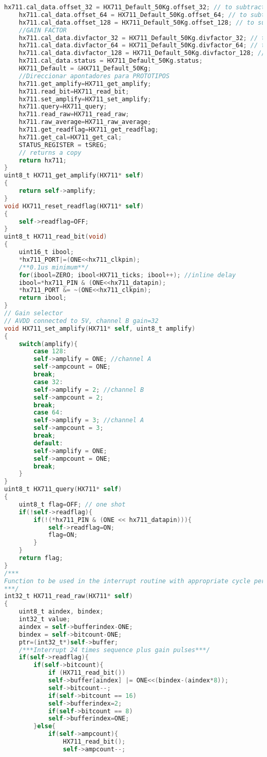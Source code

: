 \begin{lstlisting}[language=C, caption={hx711.c}, label=hx711-c, captionpos=b]
	hx711.cal_data.offset_32 = HX711_Default_50Kg.offset_32; // to subtract B
	hx711.cal_data.offset_64 = HX711_Default_50Kg.offset_64; // to subtract A 64
	hx711.cal_data.offset_128 = HX711_Default_50Kg.offset_128; // to subtract A 128
	//GAIN FACTOR
	hx711.cal_data.divfactor_32 = HX711_Default_50Kg.divfactor_32; // to divide
	hx711.cal_data.divfactor_64 = HX711_Default_50Kg.divfactor_64; // to divide
	hx711.cal_data.divfactor_128 = HX711_Default_50Kg.divfactor_128; // to divide
	hx711.cal_data.status = HX711_Default_50Kg.status;
	HX711_Default = &HX711_Default_50Kg;
	//Direccionar apontadores para PROTOTIPOS
	hx711.get_amplify=HX711_get_amplify;
	hx711.read_bit=HX711_read_bit;
	hx711.set_amplify=HX711_set_amplify;
	hx711.query=HX711_query;
	hx711.read_raw=HX711_read_raw;
	hx711.raw_average=HX711_raw_average;
	hx711.get_readflag=HX711_get_readflag;
	hx711.get_cal=HX711_get_cal;
	STATUS_REGISTER = tSREG;
	// returns a copy
	return hx711;
}
uint8_t HX711_get_amplify(HX711* self)
{
	return self->amplify;
}
void HX711_reset_readflag(HX711* self)
{
	self->readflag=OFF;
}
uint8_t HX711_read_bit(void)
{	
	uint16_t ibool;
	*hx711_PORT|=(ONE<<hx711_clkpin);
	/**0.1us minimum**/
	for(ibool=ZERO; ibool<HX711_ticks; ibool++); //inline delay
	ibool=*hx711_PIN & (ONE<<hx711_datapin);
	*hx711_PORT &= ~(ONE<<hx711_clkpin);
	return ibool;
}
// Gain selector
// AVDD connected to 5V, channel B gain=32
void HX711_set_amplify(HX711* self, uint8_t amplify)
{
	switch(amplify){
		case 128:
		self->amplify = ONE; //channel A
		self->ampcount = ONE;
		break;
		case 32:
		self->amplify = 2; //channel B
		self->ampcount = 2; 
		break;
		case 64:
		self->amplify = 3; //channel A
		self->ampcount = 3;
		break;
		default:
		self->amplify = ONE;
		self->ampcount = ONE;
		break;
	}
}
uint8_t HX711_query(HX711* self)
{
	uint8_t flag=OFF; // one shot
	if(!self->readflag){
		if(!(*hx711_PIN & (ONE << hx711_datapin))){
			self->readflag=ON;
			flag=ON;
		}
	}
	return flag;
}
/***
Function to be used in the interrupt routine with appropriate cycle period.
***/
int32_t HX711_read_raw(HX711* self)
{
	uint8_t aindex, bindex;
	int32_t value;
	aindex = self->bufferindex-ONE;
	bindex = self->bitcount-ONE;
	ptr=(int32_t*)self->buffer;
	/***Interrupt 24 times sequence plus gain pulses***/
	if(self->readflag){
		if(self->bitcount){
			if (HX711_read_bit())
			self->buffer[aindex] |= ONE<<(bindex-(aindex*8));
			self->bitcount--;
			if(self->bitcount == 16)
			self->bufferindex=2;
			if(self->bitcount == 8)
			self->bufferindex=ONE;
		}else{
			if(self->ampcount){
				HX711_read_bit();
				self->ampcount--;

\end{lstlisting}
